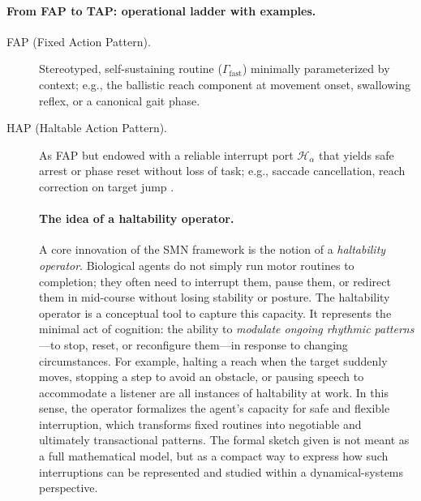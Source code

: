 \paragraph{From FAP to TAP: operational ladder with examples.} 
\begin{description} 
\item[FAP (Fixed Action Pattern).]  Stereotyped, self-sustaining routine ($\Gamma_{\text{fast}}$) minimally parameterized by context; e.g., the ballistic reach component at movement onset, swallowing reflex, or a canonical gait phase.  
\item[HAP (Haltable Action Pattern).]  As FAP but endowed with a reliable interrupt port $\mathcal{H}_\alpha$ that yields safe arrest or phase reset without loss of task; e.g., saccade cancellation, reach correction on target jump \citep{Aron2007}.  

\paragraph{The idea of a haltability operator.} A core innovation of the SMN framework is the notion of a \emph{haltability operator}.  Biological agents do not simply run motor routines to completion; they often need to interrupt them, pause them, or redirect them in mid-course without losing stability or posture.  The haltability operator is a conceptual tool to capture this capacity.  It represents the minimal act of cognition: the ability to \emph{modulate ongoing rhythmic patterns}—to stop, reset, or reconfigure them—in response to changing circumstances.  For example, halting a reach when the target suddenly moves, stopping a step to avoid an obstacle, or pausing speech to accommodate a listener are all instances of haltability at work.  In this sense, the operator formalizes the agent’s capacity for safe and flexible interruption, which transforms fixed routines into negotiable and ultimately transactional patterns.  The formal sketch given is not meant as a full mathematical model, but as a compact way to express how such interruptions can be represented and studied within a dynamical-systems perspective.  


\end{description}

